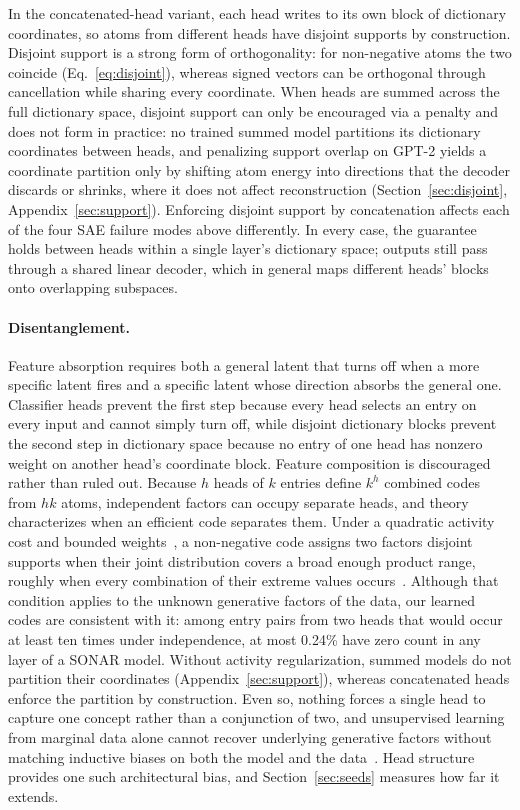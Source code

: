 In the concatenated-head variant, each head writes to its own block of
dictionary coordinates, so atoms from different heads have disjoint
supports by construction. Disjoint support is a strong form of
orthogonality: for non-negative atoms the two coincide
(Eq.~\eqref{eq:disjoint}), whereas signed vectors can be orthogonal
through cancellation while sharing every coordinate. When heads are
summed across the full dictionary space, disjoint support can only be
encouraged via a penalty and does not form in practice: no trained summed
model partitions its dictionary coordinates between heads, and penalizing
support overlap on GPT-2 yields a coordinate partition only by shifting
atom energy into directions that the decoder discards or shrinks, where
it does not affect reconstruction (Section~\ref{sec:disjoint},
Appendix~\ref{sec:support}). Enforcing disjoint support by concatenation
affects each of the four SAE failure modes above differently. In every
case, the guarantee holds between heads within a single layer's
dictionary space; outputs still pass through a shared linear decoder,
which in general maps different heads' blocks onto overlapping subspaces.

\paragraph{Disentanglement.}
Feature absorption requires both a general latent that turns off when a
more specific latent fires and a specific latent whose direction absorbs
the general one. Classifier heads prevent the first step because every
head selects an entry on every input and cannot simply turn off, while
disjoint dictionary blocks prevent the second step in dictionary space
because no entry of one head has nonzero weight on another head's
coordinate block. Feature composition is discouraged rather than ruled
out. Because $h$ heads of $k$ entries define $k^h$ combined codes from
$hk$ atoms, independent factors can occupy separate heads, and theory
characterizes when an efficient code separates them. Under a quadratic
activity cost and bounded weights~\cite{whittington2023,dorrell2025}, a
non-negative code assigns two factors disjoint supports when their joint
distribution covers a broad enough product range, roughly when every
combination of their extreme values occurs~\cite{dorrell2025}. Although
that condition applies to the unknown generative factors of the data, our
learned codes are consistent with it: among
entry pairs from two heads that would occur at least ten times under
independence, at most 0.24\% have zero count in any layer of a SONAR
model. Without activity regularization, summed models do not partition
their coordinates (Appendix~\ref{sec:support}), whereas concatenated
heads enforce the partition by construction. Even so, nothing forces a
single head to capture one concept rather than a conjunction of two, and
unsupervised learning from marginal data alone cannot recover underlying
generative factors without matching inductive biases on both the model
and the data~\cite{locatello2019}. Head structure provides one such
architectural bias, and Section~\ref{sec:seeds} measures how far it
extends.

